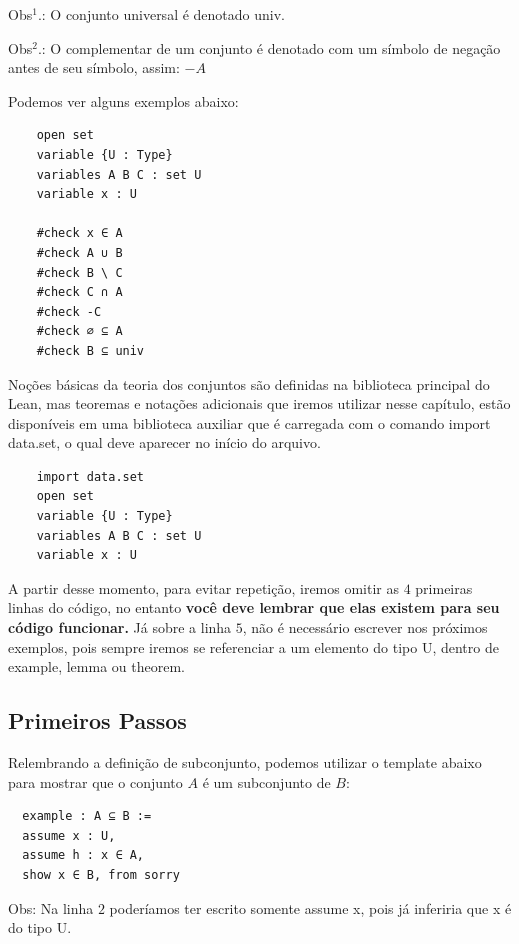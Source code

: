   Obs$^{1}$.: O conjunto universal é denotado { \selectfont univ}.

  Obs$^{2}$.: O complementar de um conjunto é denotado com um símbolo de negação antes de seu símbolo, assim: $-A$

  Podemos ver alguns exemplos abaixo:
  \begin{lstlisting}
    open set
    variable {U : Type}
    variables A B C : set U
    variable x : U

    #check x ∈ A
    #check A ∪ B
    #check B \ C
    #check C ∩ A
    #check -C
    #check ∅ ⊆ A
    #check B ⊆ univ \end{lstlisting}

  Noções básicas da teoria dos conjuntos são definidas na biblioteca principal do Lean, mas teoremas e notações adicionais que iremos utilizar nesse capítulo, estão disponíveis em uma biblioteca auxiliar que é carregada com o comando 
  { \selectfont import data.set}, o qual deve aparecer no início do arquivo.

  \begin{lstlisting}
    import data.set
    open set
    variable {U : Type}
    variables A B C : set U
    variable x : U \end{lstlisting}

  A partir desse momento, para evitar repetição, iremos omitir as $4$ primeiras linhas do código, no entanto \textbf{você deve lembrar que elas existem para seu código funcionar.} Já sobre a linha $5$, não é necessário escrever nos próximos exemplos, pois sempre iremos se referenciar a um elemento do tipo{ \selectfont U}, dentro de {\selectfont example, lemma} ou {\selectfont theorem}.

  \subsection{Primeiros Passos}

  Relembrando a definição de subconjunto, podemos utilizar o template abaixo para mostrar que o conjunto $A$ é um subconjunto de $B$:

  \begin{lstlisting}
  example : A ⊆ B :=
  assume x : U,
  assume h : x ∈ A,
  show x ∈ B, from sorry \end{lstlisting}

  Obs: Na linha $2$ poderíamos ter escrito somente {\selectfont assume x}, pois já inferiria que {\selectfont x} é do tipo {\selectfont U}.

